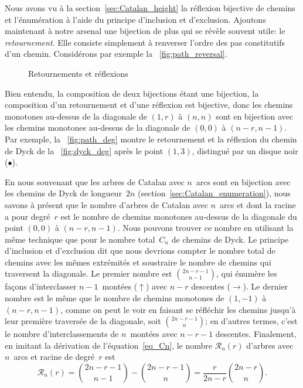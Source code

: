 Nous avons vu à la section~\vref{sec:Catalan_height} la réflexion
bijective de chemins et l'énumération à l'aide du principe d'inclusion
et d'exclusion. Ajoutons maintenant à notre arsenal une bijection de
plus qui se révèle souvent utile: le \emph{retournement}. Elle
consiste simplement à renverser l'ordre des pas constitutifs d'un
chemin. Considérons par exemple la \fig~\ref{fig:path_reversal}.
\begin{figure}
\centering
{}
\qquad
{}
\caption{Retournements et réflexions}
\end{figure}
Bien entendu, la composition de deux bijections étant une bijection,
la composition d'un retournement et d'une réflexion est bijective,
donc les chemins monotones au-dessus de la diagonale de \((1,r)\) à
\((n,n)\) sont en bijection avec les chemins monotones au-dessus de la
diagonale de \((0,0)\) à \((n-r,n-1)\). Par exemple, la
\fig~\ref{fig:path_deg} montre le retournement et la réflexion du
chemin de Dyck de la \fig~\ref{fig:dyck_deg} après le point \((1,3)\),
distingué par un disque noir (\(\bullet\)).

En nous souvenant que les arbres de Catalan avec \(n\)~arcs sont en
bijection avec les chemins de Dyck de longueur~\(2n\)
(section~\vref{sec:Catalan_enumeration}), nous savons à présent que le
nombre d'arbres de Catalan avec \(n\)~arcs et dont la racine a pour
degré~\(r\) est le nombre de chemins monotones au-dessus de la
diagonale du point \((0,0)\) à \((n-r,n-1)\). Nous pouvons trouver ce
nombre en utilisant la même technique que pour le nombre total~\(C_n\)
de chemins de Dyck. Le principe d'inclusion et d'exclusion dit que
nous devrions compter le nombre total de chemins avec les mêmes
extrémités et soustraire le nombre de chemins qui traversent la
diagonale. Le premier nombre est \(\binom{2n-r-1}{n-1}\), qui énumère
les façons d'interclasser \(n-1\)~montées (\(\uparrow\)) avec \(n-r\)
descentes (\(\rightarrow\)). Le dernier nombre est le même que le
nombre de chemins monotones de \((1,-1)\) à \((n-r,n-1)\), comme on
peut le voir en faisant se réfléchir les chemins jusqu'à leur première
traversée de la diagonale, soit \(\binom{2n-r-1}{n}\); en d'autres
termes, c'est le nombre d'interclassements de \(n\)~montées avec
\(n-r-1\) descentes. Finalement, en imitant la dérivation de
l'équation~\eqref{eq_Cn}, le nombre \(\mathcal{R}_n(r)\) d'arbres avec
\(n\)~arcs et racine de degré~\(r\) est
\begin{equation*}
\mathcal{R}_n(r) = \binom{2n-r-1}{n-1} - \binom{2n-r-1}{n}
                 = \frac{r}{2n-r} \binom{2n-r}{n}.
\end{equation*}

